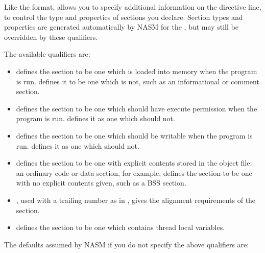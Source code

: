 
Like the  format,  allows you to specify additional
information on the  directive line, to control the type
and properties of sections you declare. Section types and properties
are generated automatically by NASM for the , but may still be overridden by these qualifiers.

The available qualifiers are:

\begin{itemize}
    \item{ defines the section to be one which is loaded into
        memory when the program is run.  defines it to be one
        which is not, such as an informational or comment section.}

    \item{ defines the section to be one which should have execute
        permission when the program is run.  defines it as one
        which should not.}

    \item{ defines the section to be one which should be writable
        when the program is run.  defines it as one which should
        not.}

    \item{ defines the section to be one with explicit contents
        stored in the object file: an ordinary code or data section, for
        example,  defines the section to be one with no explicit
        contents given, such as a BSS section.}

    \item{, used with a trailing number as in , gives the
        alignment
        requirements of the section.}

    \item{ defines the section to be one which contains
        thread local variables.}
\end{itemize}

The defaults assumed by NASM if you do not specify the above
qualifiers are:
  
  
  

